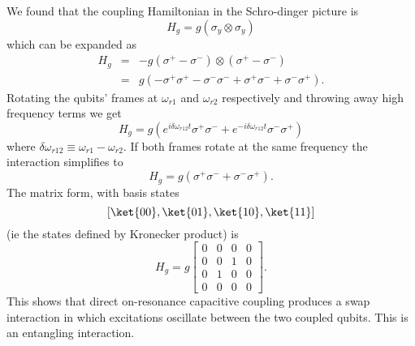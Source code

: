 We found that the coupling Hamiltonian in the Schro-dinger picture is \begin{equation}
H_g = g \left( \sigma_y \otimes \sigma_y \right) \end{equation}
which can be expanded as \begin{eqnarray}
H_g &=& -g (\sigma^+ - \sigma^-) \otimes (\sigma^+ - \sigma^-) \nonumber \\
&=& g \left(-\sigma^+ \sigma^+ - \sigma^- \sigma^- + \sigma^+ \sigma^- + \sigma^- \sigma^+ \right). \end{eqnarray}
Rotating the qubits' frames at $\omega_{r1}$ and $\omega_{r2}$ respectively and throwing away high frequency terms we get \begin{equation}
H_g = g \left( e^{i \delta\omega_{r12} t} \sigma^+ \sigma^- + e^{-i \delta\omega_{r12} t} \sigma^- \sigma^+ \right) \end{equation}
where $\delta\omega_{r12}\equiv \omega_{r1} - \omega_{r2}$.
If both frames rotate at the same frequency the interaction simplifies to \begin{equation}
H_g = g \left( \sigma^+ \sigma^- + \sigma^- \sigma^+ \right). \end{equation}
The matrix form, with basis states \begin{equation}
\left[ \ket{00}, \ket{01}, \ket{10}, \ket{11} \right] \nonumber \end{equation}
(ie the states defined by Kronecker product) is \begin{equation}
H_g = g \left[ \begin{array}{cccc} 0 & 0 & 0 & 0 \\ 0 & 0 & 1 & 0 \\ 0 & 1 & 0 & 0 \\ 0 & 0 & 0 & 0 \end{array} \right]. \end{equation}
This shows that direct on-resonance capacitive coupling produces a swap interaction in which excitations oscillate between the two coupled qubits.
This is an entangling interaction.


